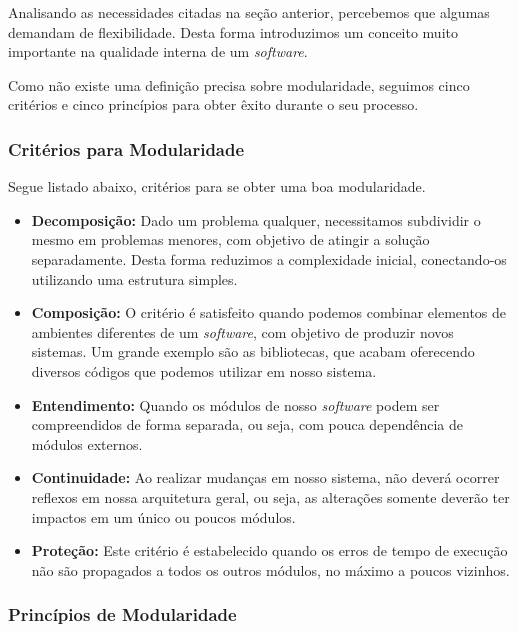 \documentclass[a4paper, 12pt]{article}
\begin{document}
		Analisando as necessidades citadas na seção anterior, percebemos que algumas demandam de flexibilidade. Desta forma introduzimos um conceito muito importante na qualidade interna de um \textit{software}.
		
		Como não existe uma definição precisa sobre modularidade, seguimos cinco critérios e cinco princípios para obter êxito durante o seu processo.
		
		\subsubsection{Critérios para Modularidade}
		
		Segue listado abaixo, critérios para se obter uma boa modularidade.
		
		\begin{itemize}
			\item \textbf{Decomposição:} Dado um problema qualquer, necessitamos subdividir o mesmo em problemas menores, com objetivo de atingir a solução separadamente. Desta forma reduzimos a complexidade inicial, conectando-os utilizando uma estrutura simples.
			
			\item \textbf{Composição:} O critério é satisfeito quando podemos combinar elementos de ambientes diferentes de um \textit{software}, com objetivo de produzir novos sistemas. Um grande exemplo são as bibliotecas, que acabam oferecendo diversos códigos que podemos utilizar em nosso sistema.
			
			\item \textbf{Entendimento:} Quando os módulos de nosso \textit{software} podem ser compreendidos de forma separada, ou seja, com pouca dependência de módulos externos.
			
			\item \textbf{Continuidade:}  Ao realizar mudanças em nosso sistema, não deverá ocorrer reflexos em nossa arquitetura geral, ou seja, as alterações somente deverão ter impactos em um único ou poucos módulos.
			
			\item \textbf{Proteção:} Este critério é estabelecido quando os erros de tempo de execução não são propagados a todos os outros módulos, no máximo a poucos vizinhos. 
		\end{itemize}
	
		\subsubsection{Princípios de Modularidade}
		
\end{document}
